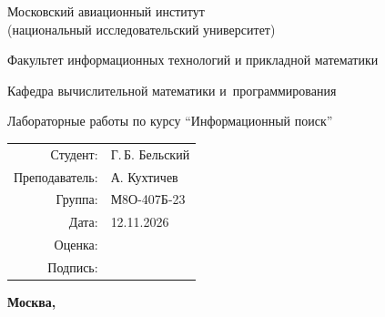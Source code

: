 \begin{titlepage}
\begin{center}
\bfseries

{\Large Московский авиационный институт\\ (национальный исследовательский университет)

}

\vspace{48pt}

{\large Факультет информационных технологий и прикладной математики
}

\vspace{36pt}

{\large Кафедра вычислительной математики и~программирования

}


\vspace{48pt}

Лабораторные работы по курсу \enquote{Информационный поиск}

\end{center}

\vspace{72pt}

\begin{flushright}
\begin{tabular}{rl}
Студент: & Г.\,Б. Бельский \\
Преподаватель: & А. Кухтичев \\
Группа: & М8О-407Б-23 \\
Дата: & 12.11.2026 \\
Оценка: & \\
Подпись: & \\
\end{tabular}
\end{flushright}

\vfill

\begin{center}
\bfseries
Москва, \the\year
\end{center}
\end{titlepage}

\pagebreak

